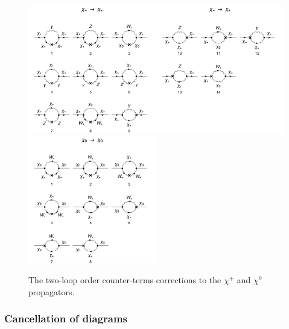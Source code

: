 \documentclass[11pt]{article}
\begin{document}
\begin{figure}[h!]
\center
\includegraphics[width=0.5\textwidth]{diagrams_F[1]_2c_1.pdf}\includegraphics[width=0.5\textwidth]{diagrams_F[1]_2c_2.pdf}
\includegraphics[width=0.5\textwidth]{diagrams_F[2]_2c.pdf}
\caption{The two-loop order counter-terms corrections to the $\chi^+$ and $\chi^0$ propagators.}\label{fig:chi_ct2}
\end{figure}

\clearpage

\subsubsection{Cancellation of diagrams}
\end{document}

